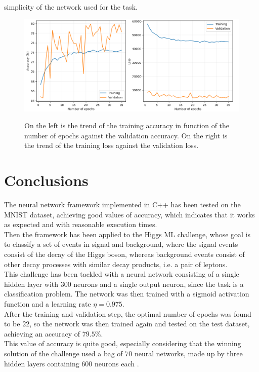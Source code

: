 \documentclass[12pt]{article}
\begin{document}
simplicity of the network used for the task.
\begin{figure}
  \centering
  \includegraphics[scale=0.45]{./img/training_validation.png}
  \label{tv}
  \caption{On the left is the trend of the training accuracy in function of the number of epochs against the
  validation accuracy. On the right is the trend of the training loss against the validation loss.}
\end{figure}
\pagebreak

\section{Conclusions}
The neural network framework implemented in C++ has been tested on the MNIST dataset, achieving good values
of accuracy, which indicates that it works as expected and with reasonable execution times. \\
Then the framework has been applied to the Higgs ML challenge, whose goal is to classify a set of events
in signal and background, where the signal events consist of the decay of the Higgs boson, whereas 
background events consist of other decay processes with similar decay products, i.e. a pair of leptons. \\
This challenge has been tackled with a neural network consisting of a single hidden layer with $300$
neurons and a single output neuron, since the task is a classification problem. The network was then 
trained with a sigmoid activation function and a learning rate $\eta = 0.975$. \\
After the training and validation step, the optimal number of epochs was found to be $22$, so the network
was then trained again and tested on the test dataset, achieving an accuracy of $79.5 \%$. \\
This value of accuracy is quite good, especially considering that the winning solution of the challenge
used a bag of $70$ neural networks, made up by three hidden layers containing $600$ neurons each 
\cite{WinningModel}.
\pagebreak

\printbibliography
\end{document}
